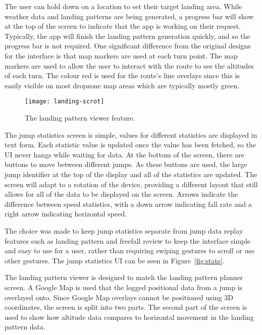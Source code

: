 The user can hold down on a location to set their target landing area. While weather data and landing patterns are being generated, a progress bar will show at the top of the screen to indicate that the app is working on their request. Typically, the app will finish the landing pattern generation quickly, and so the progress bar is not required. One significant difference from the original designs for the interface is that map markers are used at each turn point. The map markers are used to allow the user to interact with the route to see the altitudes of each turn. The colour red is used for the route's line overlays since this is easily visible on most dropzone map areas which are typically mostly green.

\begin{wrapfigure}{l}{0.25\textwidth}
    \centering
    \texttt{[image: landing-scrot]}
    \caption{The landing pattern viewer feature.}\label{fig:landing-scrot}
\end{wrapfigure}

The jump statistics screen is simple, values for different statistics are displayed in text form. Each statistic value is updated once the value has been fetched, so the UI never hangs while waiting for data. At the bottom of the screen, there are buttons to move between different jumps. As these buttons are used, the large jump identifier at the top of the display and all of the statistics are updated. The screen will adapt to a rotation of the device, providing a different layout that still allows for all of the data to be displayed on the screen. Arrows indicate the difference between speed statistics, with a down arrow indicating fall rate and a right arrow indicating horizontal speed.

The choice was made to keep jump statistics separate from jump data replay features such as landing pattern and freefall review to keep the interface simple and easy to use for a user, rather than requiring swiping gestures to scroll or use other gestures.
The jump statistics UI can be seen in Figure~\ref{fig:stats}.

The landing pattern viewer is designed to match the landing pattern planner screen. A Google Map is used that the logged positional data from a jump is overlayed onto. Since Google Map overlays cannot be positioned using 3D coordinates, the screen is split into two parts. The second part of the screen is used to show how altitude data compares to horizontal movement in the landing pattern data.


